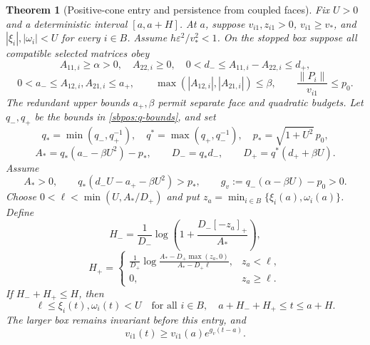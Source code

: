 \documentclass{article} %
\theoremstyle{plain}
\newtheorem{theorem}{Theorem}[section]
\theoremstyle{definition}
\theoremstyle{remark}
\begin{document}
\begin{theorem}[Positive-cone entry and persistence from coupled faces]
\label{sbpos:entry}
Fix $U>0$ and a deterministic interval $[a,a+H]$. At $a$, suppose
$v_{i1},z_{i1}>0$, $v_{i1}\ge v_*$, and
$|\xi_i|,|\omega_i|<U$ for every $i\in B$.
Assume $h\varepsilon^2/v_*^2<1$.
On the stopped box suppose all compatible selected matrices obey
\[
 A_{11,i}\ge\alpha>0,\quad A_{22,i}\ge0,\quad
 0<d_-\le A_{11,i}-A_{22,i}\le d_+,
\]
\[
 0<a_-\le A_{12,i},A_{21,i}\le a_+,\qquad
 \max(|A_{12,i}|,|A_{21,i}|)\le\beta,
 \qquad \frac{\|P_i\|}{v_{i1}}\le p_0.
\]
The redundant upper bounds $a_+,\beta$ permit separate face and quadratic
budgets. Let $q_-,q_+$ be the bounds in \eqref{sbpos:q-bounds}, and set
\[
 q_*=\min(q_-,q_+^{-1}),\quad q^*=\max(q_+,q_-^{-1}),\quad
 p_*=\sqrt{1+U^2}\,p_0,
\]
\[
 A_*=q_*(a_--\beta U^2)-p_*,\qquad
 D_-=q_*d_-,\qquad D_+=q^*(d_++\beta U).
\]
Assume
\begin{equation}\label{sbpos:face-budgets}
 A_*>0,\qquad
 q_*(d_-U-a_+-\beta U^2)>p_*,
 \qquad g_v:=q_-(\alpha-\beta U)-p_0>0.
\end{equation}
Choose $0<\ell<\min(U,A_*/D_+)$ and put
$z_a=\min_{i\in B}\{\xi_i(a),\omega_i(a)\}$.
Define
\[
 H_-=\frac1{D_-}\log\left(1+\frac{D_-[-z_a]_+}{A_*}\right),
\]
\[
 H_+=
 \begin{cases}
 \displaystyle\frac1{D_+}
 \log\frac{A_*-D_+\max(z_a,0)}{A_*-D_+\ell},&z_a<\ell,\\
 0,&z_a\ge\ell.
 \end{cases}
\]
If $H_-+H_+\le H$, then
\begin{equation}\label{sbpos:positive-box}
 \ell\le\xi_i(t),\omega_i(t)<U
 \quad\text{for all }i\in B,\quad
 a+H_-+H_+\le t\le a+H.
\end{equation}
The larger box remains invariant before this entry, and
\begin{equation}\label{sbpos:long-growth}
 v_{i1}(t)\ge v_{i1}(a)e^{g_v(t-a)}.
\end{equation}
\end{theorem}
\end{document}
